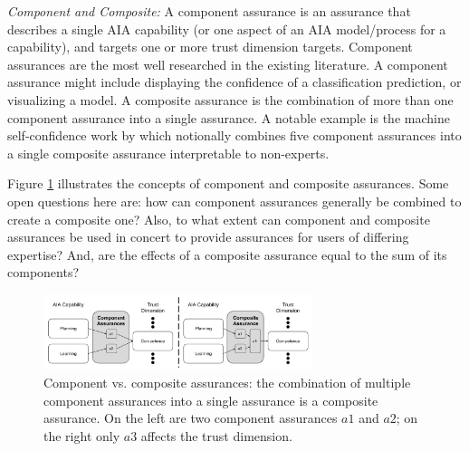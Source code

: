 \emph{Component and Composite:}
A component assurance is an assurance that describes a single AIA capability (or one aspect of an AIA model/process for a capability), and targets one or more trust dimension targets.  Component assurances are the most well researched in the existing literature. A component assurance might include displaying the confidence of a classification prediction, or visualizing a model. A composite assurance is the combination of more than one component assurance into a single assurance. 
A notable example is the machine self-confidence work by \citet{Aitken2016-cv} which notionally combines five component assurances into a single composite assurance interpretable to non-experts. 

Figure \ref{fig:assurance_mapping} illustrates the concepts of component and composite assurances. Some open questions here are: how can component assurances generally be combined to create a composite one? Also, to what extent can component and composite assurances be used in concert to provide assurances for users of differing expertise? And, are the effects of a composite assurance equal to the sum of its components?

\begin{figure}[!htbp]
    \centering
    \includegraphics[width=0.7\textwidth]{Figures/Assurance_component_composite.pdf}
    \caption{
    Component vs. composite assurances: the combination of multiple component assurances into a single assurance is a composite assurance. On the left are two component assurances $a1$ and $a2$; on the right only $a3$ affects the trust dimension.}
    \label{fig:assurance_mapping}
    \vspace{-0.1 in}
\end{figure}
